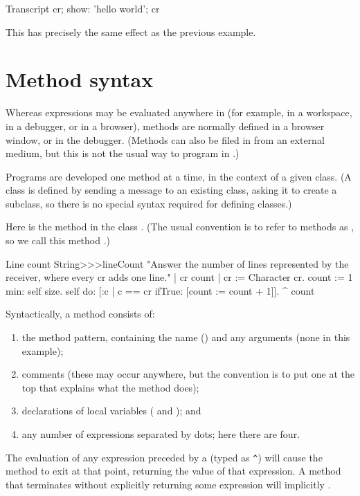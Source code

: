 \documentclass[a4paper,10pt,twoside]{book}
\begin{document}
\begin{code}{}
Transcript cr;
    show: 'hello world';
    cr
\end{code}
This has precisely the same effect as the previous example.

\section{Method syntax}

Whereas expressions may be evaluated anywhere in \sq (for example, in a workspace, in a debugger, or in a browser), methods are normally defined in a browser window, or in the debugger.
(Methods can also be filed in from an external medium, but this is not the usual way to program in \sq.)

Programs are developed one method at a time, in the context of a given class.
(A class is defined by sending a message to an existing class, asking it to create a subclass, so there is no special syntax required for defining classes.)

Here is the method  in the class .
(The usual convention is to refer to methods as , so we call this method .)

\begin{method}[lineCount]{Line count}
String>>>lineCount
   "Answer the number of lines represented by the receiver,
   where every cr adds one line."
   | cr count |
   cr := Character cr.
   count := 1  min: self size.
   self do:
      [:c | c == cr ifTrue: [count := count + 1]].
   ^ count
\end{method}

Syntactically, a method consists of:
\begin{enumerate}
  \item the method pattern, containing the name (\ie {}) and any arguments (none in this example);
  \item comments (these may occur anywhere, but the convention is to put one at the top that explains what the method does);
  \item declarations of local variables (\ie {} and ); and
  \item any number of expressions separated by dots; here there are four.
\end{enumerate}

The evaluation of any expression preceded by a \ct{^} (typed as \verb|^|) will cause the method to exit at that point, returning the value of that expression.
A method that terminates without explicitly returning some expression will implicitly  .
\end{document}
